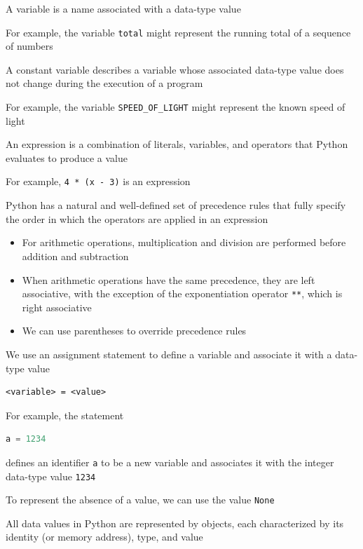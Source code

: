 \documentclass[8pt,a4paper,compress]{beamer}
\begin{document}
\begin{frame}[fragile]
\pause

A variable is a name associated with a data-type value

\pause
\bigskip

For example, the variable \lstinline{total} might represent the running total of a sequence of numbers

\pause
\bigskip

A constant variable describes a variable whose associated data-type value does not change during the execution of a program

\pause
\bigskip

For example, the variable \lstinline{SPEED_OF_LIGHT} might represent the known speed of light

\pause
\bigskip

An expression is a combination of literals, variables, and operators that Python evaluates to produce a value

\pause
\bigskip

For example, \lstinline{4 * (x - 3)} is an expression

\pause
\bigskip

Python has a natural and well-defined set of precedence rules that fully specify the order in which the operators are applied in an expression
\begin{itemize}
\item For arithmetic operations, multiplication and division are performed before addition and subtraction

\item When arithmetic operations have the same precedence, they are left associative, with the exception of the exponentiation operator \lstinline{**}, which is right associative

\item We can use parentheses to override precedence rules
\end{itemize} 
\end{frame}

\begin{frame}[fragile]
\pause

We use an assignment statement to define a variable and associate it with a data-type value
\begin{lstlisting}[language={}]
<variable> = <value>
\end{lstlisting}

\pause
\bigskip

For example, the statement 
\begin{lstlisting}[language=Python]
a = 1234
\end{lstlisting}
defines an identifier \lstinline{a} to be a new variable and associates it with the integer data-type value \lstinline{1234}

\pause
\bigskip

To represent the absence of a value, we can use the value \lstinline{None}

\pause
\bigskip

All data values in Python are represented by objects, each characterized by its identity (or memory address), type, and value
\end{frame}
\end{document}
